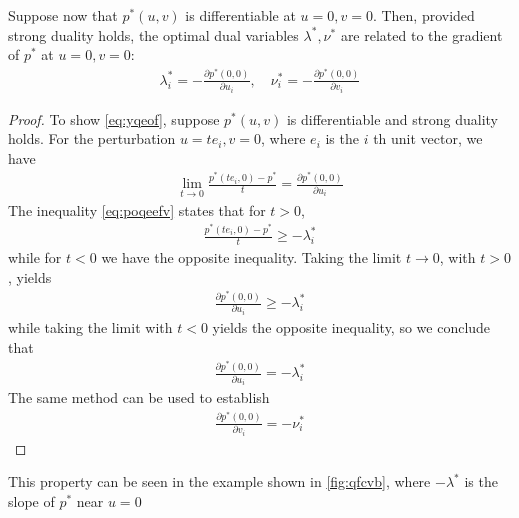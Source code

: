 \documentclass{article}
\begin{document}
Suppose now that $p^{* }(u, v)$ is differentiable at $u=0, v=0$. Then, provided strong duality holds, the optimal dual variables $\lambda^{* }, \nu^{* }$ are related to the gradient of $p^{* }$ at $u=0, v=0:$
\begin{align}
\lambda_{i}^{* }=-\frac{\partial p^{* }(0,0)}{\partial u_{i}}, \quad \nu_{i}^{* }=-\frac{\partial p^{* }(0,0)}{\partial v_{i}}\label{eq:yqeof}
\end{align}
\begin{proof}\color{ForestGreen}
To show \cref{eq:yqeof}, suppose $p^{* }(u, v)$ is differentiable and strong duality holds. For the perturbation $u=t e_{i}, v=0$, where $e_{i}$ is the $i$ th unit vector, we have
\begin{align*}
\lim _{t \rightarrow 0} \frac{p^{* }\left(t e_{i}, 0\right)-p^{* }}{t}=\frac{\partial p^{* }(0,0)}{\partial u_{i}}
\end{align*}
The inequality \cref{eq:poqeefv}  states that for $t>0$,
\begin{align*}
\frac{p^{* }\left(t e_{i}, 0\right)-p^{* }}{t} \geq-\lambda_{i}^{* }
\end{align*}
while for $t<0$ we have the opposite inequality. Taking the limit $t \rightarrow 0$, with $t>0$, yields
\begin{align*}
\frac{\partial p^{* }(0,0)}{\partial u_{i}} \geq-\lambda_{i}^{* }
\end{align*}
while taking the limit with $t<0$ yields the opposite inequality, so we conclude that
\begin{align*}
\frac{\partial p^{* }(0,0)}{\partial u_{i}}=-\lambda_{i}^{* }
\end{align*}
The same method can be used to establish
\begin{align*}
\frac{\partial p^{* }(0,0)}{\partial v_{i}}=-\nu_{i}^{* }
\end{align*}
\end{proof}


This property can be seen in the example shown in \cref{fig:qfcvb}, where $-\lambda^{* }$ is the slope of $p^{* }$ near $u=0$
\end{document}

